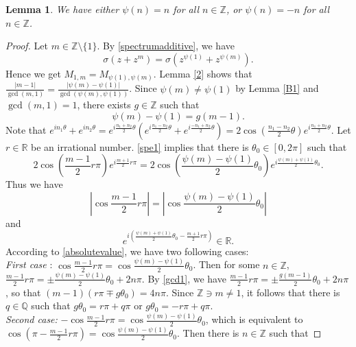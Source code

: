 \documentclass[10pt]{amsart}
\newtheorem{lemma}[theorem]{Lemma}
\begin{document}
\begin{lemma}\label{psi} 
We have either $\psi(n)=n$ for all $n \in \mathbb{Z}$, or $\psi(n)=-n$ for all $n \in \mathbb{Z}$. 
\end{lemma}
\begin{proof}
Let $m \in \mathbb{Z}\setminus \{1\}$. By \eqref{spectrumadditive}, we have 
\begin{equation}\label{spe1}
\sigma(z+z^{m})=\sigma(z^{\psi(1)}+z^{\psi(m)}).
\end{equation}
Hence we get $M_{1,m}=M_{\psi(1),\psi(m)}$. Lemma \ref{2} shows that $\frac{|m-1|}{\operatorname{gcd}(m,1)}=\frac{|\psi(m)-\psi(1)|}{\operatorname{gcd}(\psi(m),\psi(1))}$. Since $\psi(m) \neq \psi(1)$ by Lemma \ref{B1} and $\operatorname{gcd}(m,1)=1$, there exists $g \in \mathbb{Z}$ such that 
\begin{equation}\label{gcd1}
\psi(m)-\psi(1)=g(m-1).
\end{equation}
Note that $e^{in_1\theta}+e^{in_2\theta}=e^{i\frac{n_1+n_2}{2}\theta}(e^{i\frac{n_1-n_2}{2}\theta}+e^{i\frac{-n_1+n_2}{2}\theta})=2\cos(\frac{n_1-n_2}{2}\theta) e^{i\frac{n_1+n_2}{2}\theta}$. Let $r \in \mathbb{R}$ be an irrational number.  \eqref{spe1} implies that there is $\theta_0 \in [0, 2\pi]$ such that 
\[
2 \cos \left(\frac{m-1}{2} r\pi \right) e^{i\frac{m+1}{2}r \pi}=2 \cos \left(\frac{\psi(m)-\psi(1)}{2} \theta_0 \right) e^{i\frac{\psi(m)+\psi(1)}{2}\theta_0}.
\]
Thus we have
\begin{equation}\label{absolutevalue}
\left|\cos \frac{m-1}{2} r\pi \right|=\left| \cos \frac{\psi(m)-\psi(1)}{2} \theta_0 \right|
\end{equation}
and 
\begin{equation}\label{argument}
e^{i(\frac{\psi(m)+\psi(1)}{2}\theta_0-\frac{m+1}{2}r \pi)} \in \mathbb{R}.
\end{equation}
According to \eqref{absolutevalue},  we have two following cases:\\
{\it{First case} }: $\cos \frac{m-1}{2} r\pi = \cos \frac{\psi(m)-\psi(1)}{2} \theta_0$. Then for some $n \in \mathbb{Z}$,
$\frac{m-1}{2} r\pi =\pm \frac{\psi(m)-\psi(1)}{2} \theta_0+2n\pi$.
By \eqref{gcd1}, we have $\frac{m-1}{2} r\pi =\pm \frac{g(m-1)}{2} \theta_0+2n\pi$, so that $(m-1)(r \pi \mp g\theta_0)=4n\pi$. Since $\mathbb{Z} \ni m \neq 1$, it follows that there is $q \in \mathbb{Q}$ such that 
$g \theta_0=r\pi + q\pi$ or $g \theta_0=-r\pi + q\pi$. \\
{\it{Second case:}} $-\cos \frac{m-1}{2} r\pi = \cos \frac{\psi(m)-\psi(1)}{2} \theta_0$, which is equivalent to $\cos ( \pi - \frac{m-1}{2} r\pi)= \cos \frac{\psi(m)-\psi(1)}{2} \theta_0$. Then there is $n \in \mathbb{Z}$ such that 

\end{proof}
\end{document}

